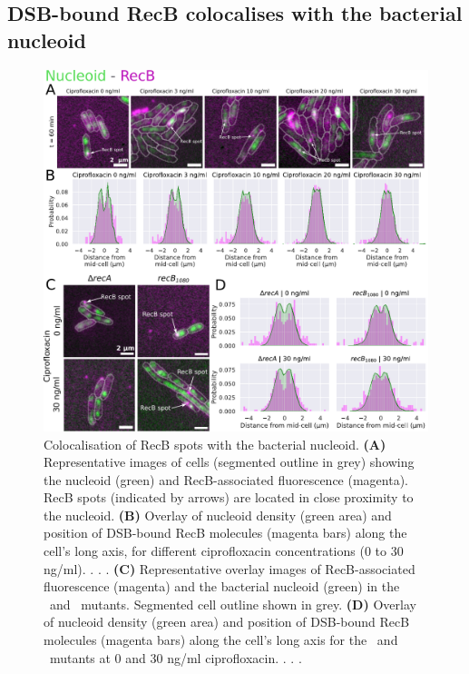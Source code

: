 \subsection*{DSB-bound RecB colocalises with the bacterial nucleoid}

\begin{figure}[htbp]
    \centering
    \includegraphics[width=.8\textwidth]{Figures/Fig4_nucleoid.pdf}
    \caption{Colocalisation of RecB spots with the bacterial nucleoid. \textbf{(A)} Representative images of cells (segmented outline in grey) showing the nucleoid (green) and RecB-associated fluorescence (magenta). RecB spots (indicated by arrows) are located in close proximity to the nucleoid. \textbf{(B)} Overlay of nucleoid density (green area) and position of DSB-bound RecB molecules (magenta bars) along the cell's long axis, for different ciprofloxacin concentrations (0 to 30 ng/ml). . . . \textbf{(C)} Representative overlay images of RecB-associated fluorescence (magenta) and the bacterial nucleoid (green) in the \dreca\ and \geneteneighty\ mutants. Segmented cell outline shown in grey. \textbf{(D)} Overlay of nucleoid density (green area) and position of DSB-bound RecB molecules (magenta bars) along the cell's long axis for the \dreca\ and \geneteneighty\ mutants at 0 and 30 ng/ml ciprofloxacin. . . .}
    \label{Fig:nucleoid}
\end{figure}

